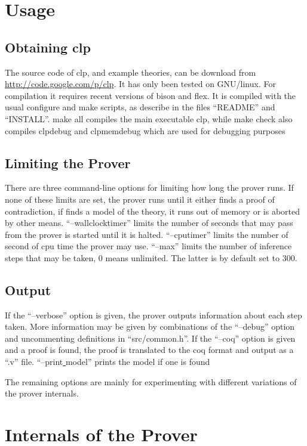 \documentclass[a4paper]{article}
\begin{document}
\section{Usage}
\subsection{Obtaining clp}
The source code of clp, and example theories, can be download from \url{http://code.google.com/p/clp}. It has only been tested on GNU/linux. For compilation it requires recent versions of bison and flex. It is compiled with the usual configure and make scripts, as describe in the files ``README'' and ``INSTALL''. make all compiles the main executable clp, while make check also compiles clpdebug and clpmemdebug which are used for debugging purposes


\subsection{Limiting the Prover}
There are three command-line options for limiting how long the prover runs. If none of these limits are set, the prover runs until it either finds a proof of contradiction, if finds a model of the theory, it runs out of memory or is aborted by other means. ``--wallclocktimer'' limits the number of seconds that may pass from the prover is started until it is halted. ``--cputimer'' limits the number of second of cpu time the prover may use. ``--max'' limits the number of inference steps that may be taken, $0$ means unlimited. The latter is by default set to $300$.

\subsection{Output}
If the ``--verbose'' option is given, the prover outputs information about each step taken. More information may be given by combinations of the ``--debug'' option and uncommenting definitions in ``src/common.h''. 
If the ``--coq'' option is given and a proof is found, the proof is translated to the coq format and output as a ``.v'' file. ``--print\underline{ }model'' prints the model if one is found

The remaining options are mainly for experimenting with different variations of the prover internals. 
\section{Internals of the Prover}
\end{document}
